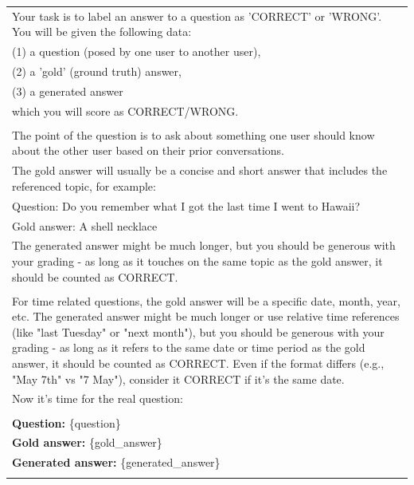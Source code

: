 \documentclass[11pt]{article}
\begin{document}
\begin{table}[!b]  
\begin{tcolorbox}[
    colback=black!5, %
    colframe=black!70!white, %
    title=LoCoMo Dataset,
    fonttitle=\bfseries,
    arc=3mm, %
    boxrule=0.8pt %
]
\begin{tabularx}{\textwidth}{X}
Your task is to label an answer to a question as 'CORRECT' or 'WRONG'. You will be given the following data:\\
\hspace{2em}(1) a question (posed by one user to another user),\\
\hspace{2em}(2) a 'gold' (ground truth) answer,\\
\hspace{2em}(3) a generated answer\\
which you will score as CORRECT/WRONG.\\\\

The point of the question is to ask about something one user should know about the other user based on their prior conversations.\\
The gold answer will usually be a concise and short answer that includes the referenced topic, for example:\\
Question: Do you remember what I got the last time I went to Hawaii?\\
Gold answer: A shell necklace\\
The generated answer might be much longer, but you should be generous with your grading - as long as it touches on the same topic as the gold answer, it should be counted as CORRECT.\\
\\
For time related questions, the gold answer will be a specific date, month, year, etc. The generated answer might be much longer or use relative time references (like "last Tuesday" or "next month"), but you should be generous with your grading - as long as it refers to the same date or time period as the gold answer, it should be counted as CORRECT. Even if the format differs (e.g., "May 7th" vs "7 May"), consider it CORRECT if it's the same date.\\

Now it's time for the real question:\\\\

\textbf{Question:} \{question\}\\
\textbf{Gold answer:} \{gold\_answer\}\\
\textbf{Generated answer:} \{generated\_answer\}\\\\


\end{tabularx}
\end{tcolorbox}
\end{table}
\end{document}
